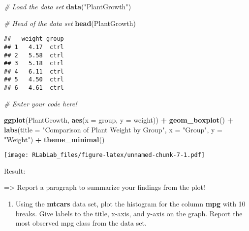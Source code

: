 \documentclass[
]{article}
\newenvironment{Shaded}{\begin{snugshade}}{\end{snugshade}}
\newcommand{\AttributeTok}[1]{\textcolor[rgb]{0.13,0.29,0.53}{#1}}
\newcommand{\CommentTok}[1]{\textcolor[rgb]{0.56,0.35,0.01}{\textit{#1}}}
\newcommand{\DecValTok}[1]{\textcolor[rgb]{0.00,0.00,0.81}{#1}}
\newcommand{\FunctionTok}[1]{\textcolor[rgb]{0.13,0.29,0.53}{\textbf{#1}}}
\newcommand{\NormalTok}[1]{#1}
\newcommand{\SpecialCharTok}[1]{\textcolor[rgb]{0.81,0.36,0.00}{\textbf{#1}}}
\newcommand{\StringTok}[1]{\textcolor[rgb]{0.31,0.60,0.02}{#1}}
\providecommand{\tightlist}{%
  \setlength{\itemsep}{0pt}\setlength{\parskip}{0pt}}
\begin{document}
\begin{Shaded}
\begin{Highlighting}[]
\CommentTok{\# Load the data set}
\FunctionTok{data}\NormalTok{(}\StringTok{"PlantGrowth"}\NormalTok{)}

\CommentTok{\# Head of the data set}
\FunctionTok{head}\NormalTok{(PlantGrowth)}
\end{Highlighting}
\end{Shaded}

\begin{verbatim}
##   weight group
## 1   4.17  ctrl
## 2   5.58  ctrl
## 3   5.18  ctrl
## 4   6.11  ctrl
## 5   4.50  ctrl
## 6   4.61  ctrl
\end{verbatim}

\begin{Shaded}
\begin{Highlighting}[]
\CommentTok{\# Enter your code here!}

\FunctionTok{ggplot}\NormalTok{(PlantGrowth, }\FunctionTok{aes}\NormalTok{(}\AttributeTok{x =}\NormalTok{ group, }\AttributeTok{y =}\NormalTok{ weight)) }\SpecialCharTok{+}
  \FunctionTok{geom\_boxplot}\NormalTok{() }\SpecialCharTok{+}
  \FunctionTok{labs}\NormalTok{(}\AttributeTok{title =} \StringTok{"Comparison of Plant Weight by Group"}\NormalTok{, }
       \AttributeTok{x =} \StringTok{"Group"}\NormalTok{, }
       \AttributeTok{y =} \StringTok{"Weight"}\NormalTok{) }\SpecialCharTok{+}
  \FunctionTok{theme\_minimal}\NormalTok{()}
\end{Highlighting}
\end{Shaded}

\texttt{[image: RLabLab\_files/figure-latex/unnamed-chunk-7-1.pdf]}

Result:

=\textgreater{} Report a paragraph to summarize your findings from the
plot!

\begin{enumerate}
\def\labelenumi{\alph{enumi}.}
\setcounter{enumi}{1}
\tightlist
\item
  Using the \textbf{mtcars} data set, plot the histogram for the column
  \textbf{mpg} with 10 breaks. Give labels to the title, x-axis, and
  y-axis on the graph. Report the most observed mpg class from the data
  set.
\end{enumerate}

\begin{Shaded}
\end{Shaded}
\end{document}

